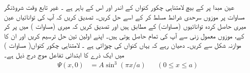 عین مبدا پر   کے بیچ لامتناہی چکور کنواں کے اندر اور اس کے باہر  ہے ۔ غیر  تابع وقت  شروڈنگر مساوات پر موزوں سرحدی شرائط مسلط کر کے اسے حل کریں۔ تصدیق کریں کہ آپ کی توانائیاں عین  میری حاصل کردہ توانائیوں    (مساوات) کے مطابق ہیں     اور تصدیق کریں کہ میری  (مساوات    )  میں     پر کر کے،  موزوں  معمول  زنی   سے آپ کی  تمام  حاصل   ہوتی ہیں۔ اپنے اولین تین حل ترسیم کریں اور ان کا موازنہ شکل   سے کریں۔  دھیان رہے کہ یہاں کنواں کی چوڑائی   ہے ۔ 
 لامتناہی چکور کنواں( مساوات )   میں ایک ذرے کا  ابتدائی تفاعل موج درج ذیل ہے۔
 \begin{align*}
  \Psi(x,0)&=A\sin^{3}(\pi x/a) && (0\le x\le a)
\end{align*}

